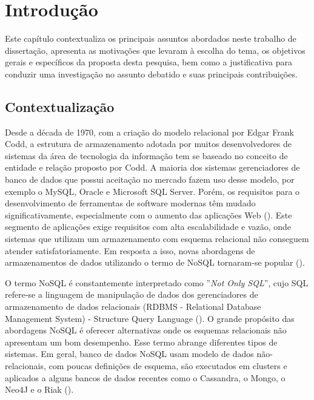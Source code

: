 
\chapter{Introdução}
\label{chp:introduction}


\noindent Este capítulo contextualiza os principais assuntos abordados neste trabalho de dissertação, apresenta as motivações que levaram à escolha do tema, os objetivos gerais e específicos da proposta desta pesquisa, bem como a justificativa para conduzir uma investigação no assunto debatido e suas principais contribuições.
\clearpage


\section{Contextualização}

Desde a década de 1970, com a criação do modelo relacional por Edgar Frank Codd, a estrutura de armazenamento adotada por muitos desenvolvedores de sistemas da área de tecnologia da informação tem se baseado no conceito de entidade e relação proposto por Codd. A maioria dos sistemas gerenciadores de banco de dados que possui aceitação no mercado fazem uso desse modelo, por exemplo o MySQL, Oracle e Microsoft SQL Server. Porém, os requisitos para o desenvolvimento de ferramentas de software modernas têm mudado significativamente, especialmente com o aumento das aplicações Web (\cite{nasholm:2012}). Este segmento de aplicações exige requisitos com alta escalabilidade e vazão, onde sistemas que utilizam um armazenamento com esquema relacional não conseguem atender satisfatoriamente. Em resposta a isso, novas abordagens de armazenamentos de dados utilizando o termo de NoSQL tornaram-se popular (\cite{silva:2016}).

O termo NoSQL é constantemente interpretado como  ''\emph{Not Only SQL}'', cujo SQL refere-se a linguagem de manipulação de dados dos gerenciadores de armazenamento de dados relacionais (RDBMS - Relational Database Management System) - Structure Query Language (\cite{nasholm:2012}). O grande propósito das abordagens NoSQL é oferecer alternativas onde os esquemas relacionais não apresentam um bom desempenho. Esse termo abrange diferentes tipos de sistemas. Em geral, banco de dados NoSQL usam modelo de dados não-relacionais, com poucas definições de esquema, são executados em clusters e aplicados a alguns bancos de dados recentes como o Cassandra, o Mongo, o Neo4J e o Riak (\cite{fowler:2013}).

